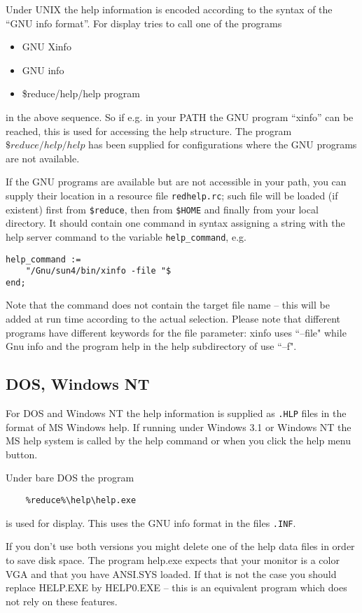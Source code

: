Under UNIX the {\REDUCE}  help information is encoded according
to the syntax of the ``GNU info format''. For display {\REDUCE} 
tries to call one of the programs
\begin{itemize}
\item GNU Xinfo
\item GNU info
\item \$reduce/help/help program
\end{itemize}
in the above sequence. So if e.g. in your PATH the GNU program
``xinfo'' can be reached, this is used for accessing the
{\REDUCE}  help structure. The program $\$reduce/help/help$
has been supplied for configurations where the GNU programs are
not available.

If the GNU programs are available but are not accessible in
your path, you can supply their location in a resource file
{\tt redhelp.rc}; such file will be loaded (if existent)
first from {\tt \$reduce}, then from {\tt \$HOME} and 
finally  from your local directory. It should contain
one command in {\REDUCE} syntax assigning
a string with the help server command to the variable
{\tt help\_command}, e.g.

\begin{verbatim}
help_command := 
    "/Gnu/sun4/bin/xinfo -file "$
end;
\end{verbatim}
Note that the command does not contain the target file
name -- this will be added at run time according to the
actual selection. Please note that different programs
have different keywords for the file parameter: xinfo uses 
``--file" while Gnu info and the program help in the
help subdirectory of {\REDUCE} use ``--f".


\subsection{DOS, Windows NT}

For DOS and Windows NT the {\REDUCE}  help information is 
supplied as {\tt .HLP} files in the format of MS Windows help. 
If running under
Windows 3.1 or Windows NT the MS help system is called 
by the help command or when you click the help menu button.

Under bare DOS the program 
\begin{verbatim}
    %reduce%\help\help.exe
\end{verbatim}
is used for display. This uses the GNU info format in
the files {\tt *.INF}. 

If you don't use both versions you might
delete one of the help data files in order to save disk space.
The program help.exe expects that your monitor is a color VGA and
that you have ANSI.SYS loaded. If that is not the case you
should replace HELP.EXE by HELP0.EXE -- this is an equivalent
program which does not rely on these features.


